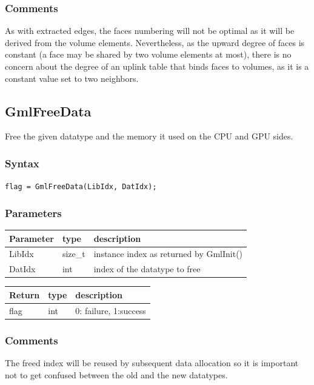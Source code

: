 \documentclass[a4paper,12pt]{article}
\begin{document}
\subsubsection*{Comments}
As with extracted edges, the faces numbering will not be optimal as it will be derived from the volume elements. Nevertheless, as the upward degree of faces is constant (a face may be shared by two volume elements at most), there  is no concern about the degree of an uplink table that binds faces to volumes, as it is a constant value set to two neighbors.


\subsection{GmlFreeData}
Free the given datatype and the memory it used on the CPU and GPU sides.

\subsubsection*{Syntax}
{\tt flag = GmlFreeData(LibIdx, DatIdx);}

\subsubsection*{Parameters}

\begin{tabular}{|m{2cm}|m{1.5cm}|m{10.5cm}|}
\hline
Parameter  & type    & description \\
\hline
LibIdx     & size\_t & instance index as returned by GmlInit() \\
\hline
DatIdx     & int     & index of the datatype to free \\
\hline
\end{tabular}

\medskip

\begin{tabular}{|m{2cm}|m{1.5cm}|m{10.5cm}|}
\hline
Return     & type   & description \\
\hline
flag       & int    & 0: failure, 1:success \\
\hline
\end{tabular}

\subsubsection*{Comments}
The freed index will be reused by subsequent data allocation so it is important not to get confused between the old and the new datatypes.
\end{document}
